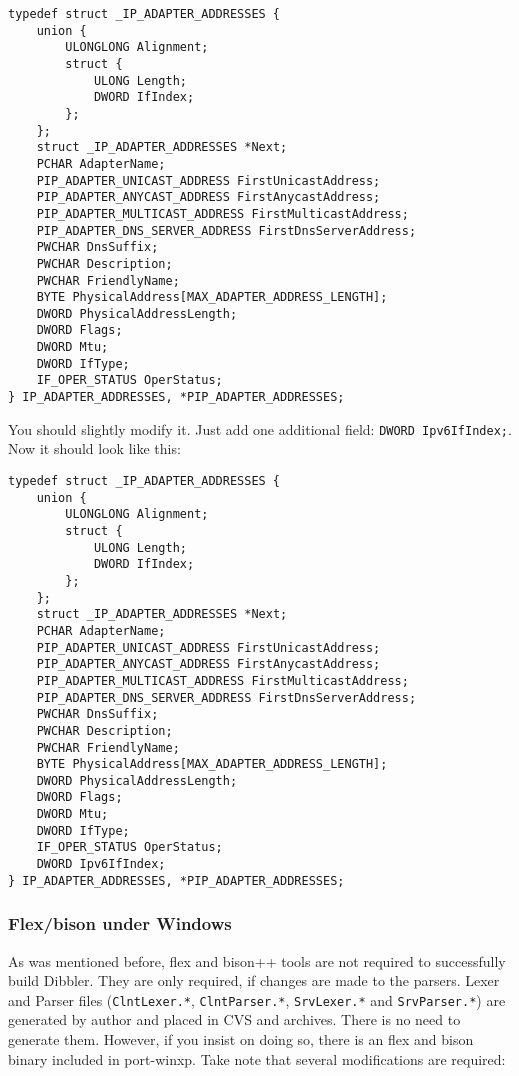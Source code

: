 \begin{verbatim}
typedef struct _IP_ADAPTER_ADDRESSES {
    union {
        ULONGLONG Alignment;
        struct {
            ULONG Length;
            DWORD IfIndex;
        };
    };
    struct _IP_ADAPTER_ADDRESSES *Next;
    PCHAR AdapterName;
    PIP_ADAPTER_UNICAST_ADDRESS FirstUnicastAddress;
    PIP_ADAPTER_ANYCAST_ADDRESS FirstAnycastAddress;
    PIP_ADAPTER_MULTICAST_ADDRESS FirstMulticastAddress;
    PIP_ADAPTER_DNS_SERVER_ADDRESS FirstDnsServerAddress;
    PWCHAR DnsSuffix;
    PWCHAR Description;
    PWCHAR FriendlyName;
    BYTE PhysicalAddress[MAX_ADAPTER_ADDRESS_LENGTH];
    DWORD PhysicalAddressLength;
    DWORD Flags;
    DWORD Mtu;
    DWORD IfType;
    IF_OPER_STATUS OperStatus;
} IP_ADAPTER_ADDRESSES, *PIP_ADAPTER_ADDRESSES;
\end{verbatim}

You should slightly modify it. Just add one additional field:
\verb+DWORD Ipv6IfIndex;+. Now it should look like this:

\begin{verbatim}
typedef struct _IP_ADAPTER_ADDRESSES {
    union {
        ULONGLONG Alignment;
        struct {
            ULONG Length;
            DWORD IfIndex;
        };
    };
    struct _IP_ADAPTER_ADDRESSES *Next;
    PCHAR AdapterName;
    PIP_ADAPTER_UNICAST_ADDRESS FirstUnicastAddress;
    PIP_ADAPTER_ANYCAST_ADDRESS FirstAnycastAddress;
    PIP_ADAPTER_MULTICAST_ADDRESS FirstMulticastAddress;
    PIP_ADAPTER_DNS_SERVER_ADDRESS FirstDnsServerAddress;
    PWCHAR DnsSuffix;
    PWCHAR Description;
    PWCHAR FriendlyName;
    BYTE PhysicalAddress[MAX_ADAPTER_ADDRESS_LENGTH];
    DWORD PhysicalAddressLength;
    DWORD Flags;
    DWORD Mtu;
    DWORD IfType;
    IF_OPER_STATUS OperStatus;
    DWORD Ipv6IfIndex;
} IP_ADAPTER_ADDRESSES, *PIP_ADAPTER_ADDRESSES;
\end{verbatim}

\subsubsection{Flex/bison under Windows}
As was mentioned before, flex and bison++ tools are not required to
successfully build Dibbler. They are only required, if changes are
made to the parsers. Lexer and Parser files (\verb+ClntLexer.*+, \verb+ClntParser.*+, \verb+SrvLexer.*+ and
\verb+SrvParser.*+) are generated by author and placed in CVS and
archives. There is no need to generate them. However, if you insist on
doing so, there is an flex and bison binary included in port-winxp. Take note that
several modifications are required:

